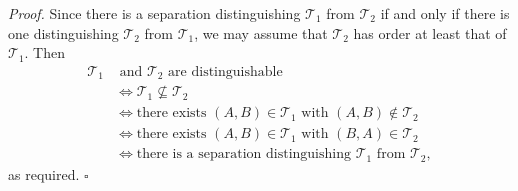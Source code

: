 \textit{Proof.} Since there is a separation distinguishing $\mathscr{T}_1$ from $\mathscr{T}_2$ if and only if there is one distinguishing $\mathscr{T}_2$ from $\mathscr{T}_1$, we may assume that $\mathscr{T}_2$ has order at least that of $\mathscr{T}_1$. Then
\begin{align*}
\mathscr{T}_1 &\text{ and } \mathscr{T}_2 \text{ are distinguishable} \\
&\Leftrightarrow \mathscr{T}_1 \nsubseteq \mathscr{T}_2 \\
&\Leftrightarrow \text{there exists } (A, B) \in \mathscr{T}_1 \text{ with } (A, B) \notin \mathscr{T}_2 \\
&\Leftrightarrow \text{there exists } (A, B) \in \mathscr{T}_1 \text{ with } (B, A) \in \mathscr{T}_2 \\
&\Leftrightarrow \text{there is a separation distinguishing } \mathscr{T}_1 \text{ from } \mathscr{T}_2,
\end{align*}
as required. $\square$

